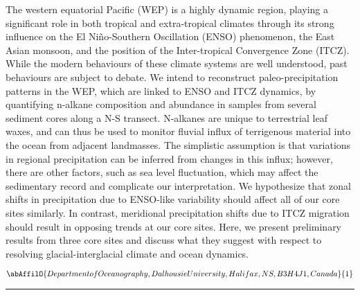 \noindent The western equatorial Pacific (WEP) is a highly dynamic region, playing a significant role in both tropical and extra-tropical climates through its strong influence on the El Ni\~{n}o-Southern Oscillation (ENSO) phenomenon, the East Asian monsoon, and the position of the Inter-tropical Convergence Zone (ITCZ).  While the modern behaviours of these climate systems are well understood, past behaviours are subject to debate.  We intend to reconstruct paleo-precipitation patterns in the WEP, which are linked to ENSO and ITCZ dynamics, by quantifying n-alkane composition and abundance in samples from several sediment cores along a N-S transect.  N-alkanes are unique to terrestrial leaf waxes, and can thus be used to monitor fluvial influx of terrigenous material into the ocean from adjacent landmasses.  The simplistic assumption is that variations in regional precipitation can be inferred from changes in this influx; however, there are other factors, such as sea level fluctuation, which may affect the sedimentary record and complicate our interpretation.  We hypothesize that zonal shifts in precipitation due to ENSO-like variability should affect all of our core sites similarly.  In contrast, meridional precipitation shifts due to ITCZ migration should result in opposing trends at our core sites.  Here, we present preliminary results from three core sites and discuss what they suggest with respect to resolving glacial-interglacial climate and ocean dynamics.           

\begin{center}
   \vspace{2 mm} \begin{center}
    \vspace{2 mm}\begin{center}
  
  $\abAffilO{Department of Oceanography, Dalhousie University, Halifax, NS, B3H 4J1, Canada}{1}$

  \end{center}
  \vspace{2 mm}
  \end{center}\end{center}
  \begin{center}\rule{0.70\linewidth}{0.5 pt}\end{center}

